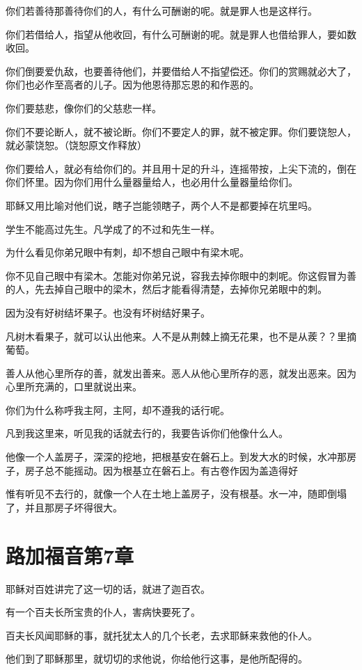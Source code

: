 \documentclass[12pt,oneside]{book}
\begin{document}
你们若善待那善待你们的人，有什么可酬谢的呢。就是罪人也是这样行。

你们若借给人，指望从他收回，有什么可酬谢的呢。就是罪人也借给罪人，要如数收回。

你们倒要爱仇敌，也要善待他们，并要借给人不指望偿还。你们的赏赐就必大了，你们也必作至高者的儿子。因为他恩待那忘恩的和作恶的。

你们要慈悲，像你们的父慈悲一样。

你们不要论断人，就不被论断。你们不要定人的罪，就不被定罪。你们要饶恕人，就必蒙饶恕。（饶恕原文作释放）

你们要给人，就必有给你们的。并且用十足的升斗，连摇带按，上尖下流的，倒在你们怀里。因为你们用什么量器量给人，也必用什么量器量给你们。

耶稣又用比喻对他们说，瞎子岂能领瞎子，两个人不是都要掉在坑里吗。

学生不能高过先生。凡学成了的不过和先生一样。

为什么看见你弟兄眼中有刺，却不想自己眼中有梁木呢。

你不见自己眼中有梁木。怎能对你弟兄说，容我去掉你眼中的刺呢。你这假冒为善的人，先去掉自己眼中的梁木，然后才能看得清楚，去掉你兄弟眼中的刺。

因为没有好树结坏果子。也没有坏树结好果子。

凡树木看果子，就可以认出他来。人不是从荆棘上摘无花果，也不是从蒺？？里摘葡萄。

善人从他心里所存的善，就发出善来。恶人从他心里所存的恶，就发出恶来。因为心里所充满的，口里就说出来。

你们为什么称呼我主阿，主阿，却不遵我的话行呢。

凡到我这里来，听见我的话就去行的，我要告诉你们他像什么人。

他像一个人盖房子，深深的挖地，把根基安在磐石上。到发大水的时候，水冲那房子，房子总不能摇动。因为根基立在磐石上。有古卷作因为盖造得好

惟有听见不去行的，就像一个人在土地上盖房子，没有根基。水一冲，随即倒塌了，并且那房子坏得很大。

\chapter{路加福音第7章}
耶稣对百姓讲完了这一切的话，就进了迦百农。

有一个百夫长所宝贵的仆人，害病快要死了。

百夫长风闻耶稣的事，就托犹太人的几个长老，去求耶稣来救他的仆人。

他们到了耶稣那里，就切切的求他说，你给他行这事，是他所配得的。
\end{document}
